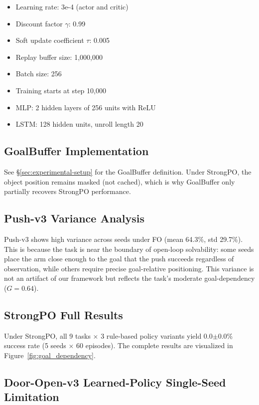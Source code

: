 \begin{itemize}
\item Learning rate: 3e-4 (actor and critic)
\item Discount factor $\gamma$: 0.99
\item Soft update coefficient $\tau$: 0.005
\item Replay buffer size: 1,000,000
\item Batch size: 256
\item Training starts at step 10,000
\item MLP: 2 hidden layers of 256 units with ReLU
\item LSTM: 128 hidden units, unroll length 20
\end{itemize}

\subsection{GoalBuffer Implementation}

See \S\ref{sec:experimental-setup} for the GoalBuffer definition. Under StrongPO, the object position remains masked (not cached), which is why GoalBuffer only partially recovers StrongPO performance.

\subsection{Push-v3 Variance Analysis}

Push-v3 shows high variance across seeds under FO (mean 64.3\%, std 29.7\%). This is because the task is near the boundary of open-loop solvability: some seeds place the arm close enough to the goal that the push succeeds regardless of observation, while others require precise goal-relative positioning. This variance is not an artifact of our framework but reflects the task's moderate goal-dependency ($G = 0.64$).

\subsection{StrongPO Full Results}

Under StrongPO, all 9 tasks $\times$ 3 rule-based policy variants yield 0.0$\pm$0.0\% success rate (5 seeds $\times$ 60 episodes). The complete results are visualized in Figure~\ref{fig:goal_dependency}.

\subsection{Door-Open-v3 Learned-Policy Single-Seed Limitation}

